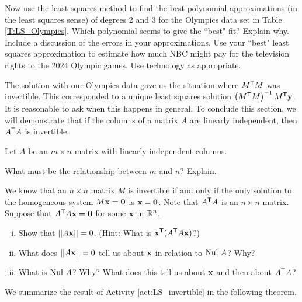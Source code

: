 \begin{activity} Now use the least squares method to find the best polynomial approximations (in the least squares sense) of degrees 2 and 3 for the Olympics data set in Table \ref{T:LS_Olympics}. Which polynomial seems to give the ``best" fit? Explain why. Include a discussion of the errors in your approximations. Use your ``best" least squares approximation to estimate how much NBC might pay for the television rights to the 2024 Olympic games. Use technology as appropriate.

\end{activity}

The solution with our Olympics data gave us the situation where $M^{\mathsf{T}}M$ was invertible. This corresponded to a unique least squares solution $ \left(M^{\mathsf{T}}M\right)^{-1}M^{\mathsf{T}}\mathbf{y}$. It is reasonable to ask when this happens in general. To conclude this section, we will demonstrate that if the columns of a matrix $A$ are linearly independent, then $A^{\mathsf{T}}A$ is invertible.

\begin{activity} \label{act:LS_invertible} Let $A$ be an $m \times n$ matrix with linearly independent columns.
\ba
\item What must be the relationship between $m$ and $n$? Explain. 

\item We know that an $n \times n$ matrix $M$ is invertible if and only if the only solution to the homogeneous system $M \mathbf{x} = \mathbf{0}$ is $\mathbf{x} = \mathbf{0}$. Note that $A^{\mathsf{T}}A$ is an $n \times n$ matrix. Suppose that $A^{\mathsf{T}}A \mathbf{x} = \mathbf{0}$ for some $\mathbf{x}$ in $\mathbb{R}^n$. 
	\begin{enumerate}[i.]
	\item Show that $||A\mathbf{x}|| = 0$. (Hint: What is $\mathbf{x}^{\mathsf{T}} (A^{\mathsf{T}}A \mathbf{x})$?)

	\item What does $||A\mathbf{x}|| = 0$ tell us about $\mathbf{x}$ in relation to $\text{Nul } A$? Why?

	\item What is $\text{Nul } A$? Why? What does this tell us about $\mathbf{x}$ and then about $A^{\mathsf{T}}A$?
	

	\end{enumerate}

\ea

\end{activity}

We summarize the result of Activity \ref{act:LS_invertible} in the following theorem.

